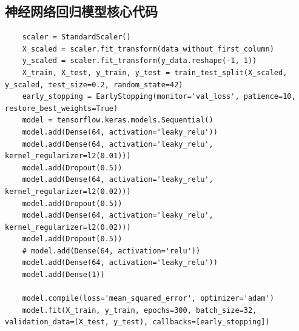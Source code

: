 \documentclass[UTF8, a4paper]{ctexart}
\begin{document}
\subsection{神经网络回归模型核心代码}\label{net_program}
\begin{lstlisting}
	scaler = StandardScaler()
	X_scaled = scaler.fit_transform(data_without_first_column)
	y_scaled = scaler.fit_transform(y_data.reshape(-1, 1))
	X_train, X_test, y_train, y_test = train_test_split(X_scaled, y_scaled, test_size=0.2, random_state=42)
	early_stopping = EarlyStopping(monitor='val_loss', patience=10, restore_best_weights=True)
	model = tensorflow.keras.models.Sequential()
	model.add(Dense(64, activation='leaky_relu'))
	model.add(Dense(64, activation='leaky_relu', kernel_regularizer=l2(0.01)))
	model.add(Dropout(0.5))
	model.add(Dense(64, activation='leaky_relu', kernel_regularizer=l2(0.02)))
	model.add(Dropout(0.5))
	model.add(Dense(64, activation='leaky_relu', kernel_regularizer=l2(0.02)))
	model.add(Dropout(0.5))
	# model.add(Dense(64, activation='relu'))
	model.add(Dense(64, activation='leaky_relu'))
	model.add(Dense(1))
	
	model.compile(loss='mean_squared_error', optimizer='adam')
	model.fit(X_train, y_train, epochs=300, batch_size=32, validation_data=(X_test, y_test), callbacks=[early_stopping])
\end{lstlisting}
\end{document}
